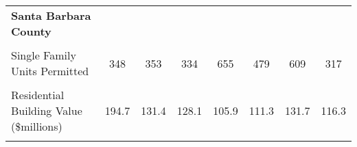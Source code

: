 \begin{table}
\begin{tabular}{lccccccc}
\addlinespace
\textbf{Santa Barbara County} & \textbf{} & \textbf{} & \textbf{} & \textbf{} & \textbf{} & \textbf{} & \textbf{}\\
\cellcolor{gray!6}{Total Residential Units Permitted} & \cellcolor{gray!6}{898} & \cellcolor{gray!6}{1,047} & \cellcolor{gray!6}{971} & \cellcolor{gray!6}{1,310} & \cellcolor{gray!6}{846} & \cellcolor{gray!6}{1,069} & \cellcolor{gray!6}{408}\\
Single Family Units Permitted & 348 & 353 & 334 & 655 & 479 & 609 & 317\\
\cellcolor{gray!6}{Multiple Family Units Permitted} & \cellcolor{gray!6}{550} & \cellcolor{gray!6}{694} & \cellcolor{gray!6}{637} & \cellcolor{gray!6}{576} & \cellcolor{gray!6}{367} & \cellcolor{gray!6}{460} & \cellcolor{gray!6}{91}\\
Residential Building Value (\$millions) & 194.7 & 131.4 & 128.1 & 105.9 & 111.3 & 131.7 & 116.3\\
\addlinespace
\cellcolor{gray!6}{Source: Construction Industry Research Board} & \cellcolor{gray!6}{} & \cellcolor{gray!6}{} & \cellcolor{gray!6}{} & \cellcolor{gray!6}{} & \cellcolor{gray!6}{} & \cellcolor{gray!6}{} & \cellcolor{gray!6}{}\\
\bottomrule
\end{tabular}
\end{table}
